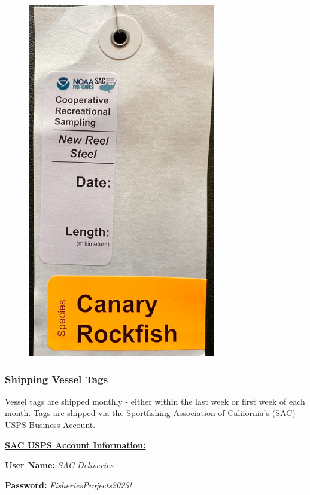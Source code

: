 \documentclass[
  letterpaper,
  DIV=11,
  numbers=noendperiod]{scrartcl}
\begin{document}
\begin{figure}[H]

{\centering \includegraphics{Vessel-Tag.png}

}

\end{figure}

\hypertarget{shipping-vessel-tags}{%
\subsubsection{Shipping Vessel Tags}\label{shipping-vessel-tags}}

Vessel tags are shipped monthly - either within the last week or first
week of each month. Tags are shipped via the Sportfishing Association of
California's (SAC) USPS Business Account.

\ul{\textbf{SAC USPS Account Information:}}

\textbf{User Name:} \emph{SAC-Deliveries}

\textbf{Password:} \emph{FisheriesProjects2023!}
\end{document}
